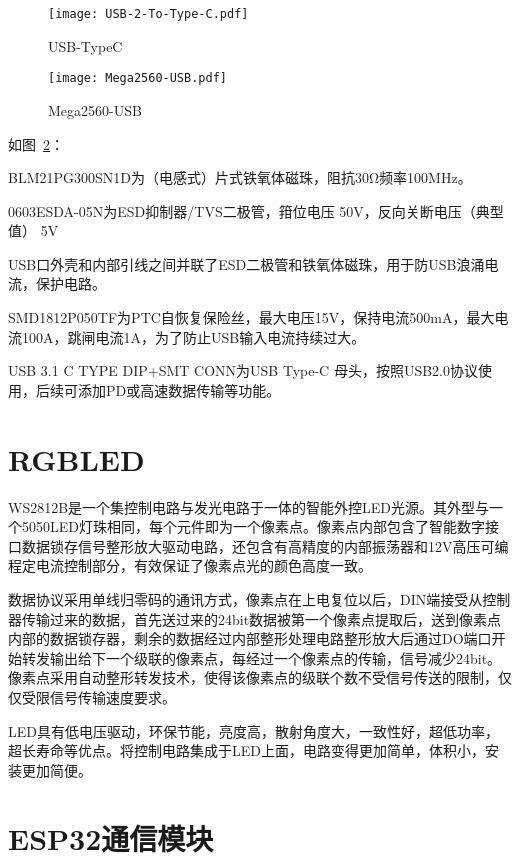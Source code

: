 \begin{figure}[htbp]
    \centering
    \texttt{[image: USB-2-To-Type-C.pdf]}
    \caption{USB-TypeC}
    \label{fig:USB-TypeC}
\end{figure}



\begin{figure}[htbp]
    \centering
    \texttt{[image: Mega2560-USB.pdf]}
    \caption{Mega2560-USB}
    \label{fig:Mega2560-USB}
\end{figure}

如图~\ref{fig:Mega2560-USB}：

BLM21PG300SN1D为（电感式）片式铁氧体磁珠，阻抗30Ω频率100MHz。

0603ESDA-05N为ESD抑制器/TVS二极管，箝位电压	50V，反向关断电压（典型值）	5V

USB口外壳和内部引线之间并联了ESD二极管和铁氧体磁珠，用于防USB浪涌电流，保护电路。

SMD1812P050TF为PTC自恢复保险丝，最大电压15V，保持电流500mA，最大电流100A，跳闸电流1A，为了防止USB输入电流持续过大。

USB 3.1 C TYPE DIP+SMT CONN为USB Type-C 母头，按照USB2.0协议使用，后续可添加PD或高速数据传输等功能。

\section{RGBLED}

WS2812B是一个集控制电路与发光电路于一体的智能外控LED光源。其外型与一个5050LED灯珠相同，每个元件即为一个像素点。像素点内部包含了智能数字接口数据锁存信号整形放大驱动电路，还包含有高精度的内部振荡器和12V高压可编程定电流控制部分，有效保证了像素点光的颜色高度一致。

数据协议采用单线归零码的通讯方式，像素点在上电复位以后，DIN端接受从控制器传输过来的数据，首先送过来的24bit数据被第一个像素点提取后，送到像素点内部的数据锁存器，剩余的数据经过内部整形处理电路整形放大后通过DO端口开始转发输出给下一个级联的像素点，每经过一个像素点的传输，信号减少24bit。像素点采用自动整形转发技术，使得该像素点的级联个数不受信号传送的限制，仅仅受限信号传输速度要求。

LED具有低电压驱动，环保节能，亮度高，散射角度大，一致性好，超低功率，超长寿命等优点。将控制电路集成于LED上面，电路变得更加简单，体积小，安装更加简便。


\section{ESP32通信模块}

